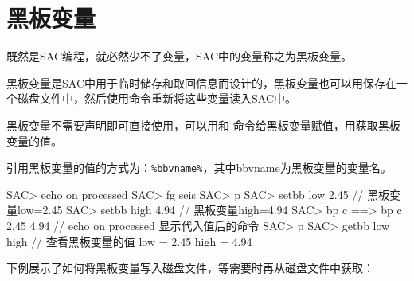 \section{黑板变量}
既然是SAC编程，就必然少不了变量，SAC中的变量称之为黑板变量。

黑板变量是SAC中用于临时储存和取回信息而设计的，黑板变量也可以用保存在一个磁盘文件中，然后使用命令重新将这些变量读入SAC中。

黑板变量不需要声明即可直接使用，可以用和
命令给黑板变量赋值，用获取黑板变量的值。

引用黑板变量的值的方式为：\lstinline{%bbvname%}，其中bbvname为黑板变量的变量名。

\begin{SACCode}
SAC> echo on processed          
SAC> fg seis
SAC> p
SAC> setbb low 2.45         // 黑板变量low=2.45
SAC> setbb high 4.94        // 黑板变量high=4.94
SAC> bp c %
 ==>  bp c 2.45 4.94        // echo on processed 显示代入值后的命令
SAC> p
SAC> getbb low high         // 查看黑板变量的值
 low = 2.45
 high = 4.94
\end{SACCode}

下例展示了如何将黑板变量写入磁盘文件，等需要时再从磁盘文件中获取：
